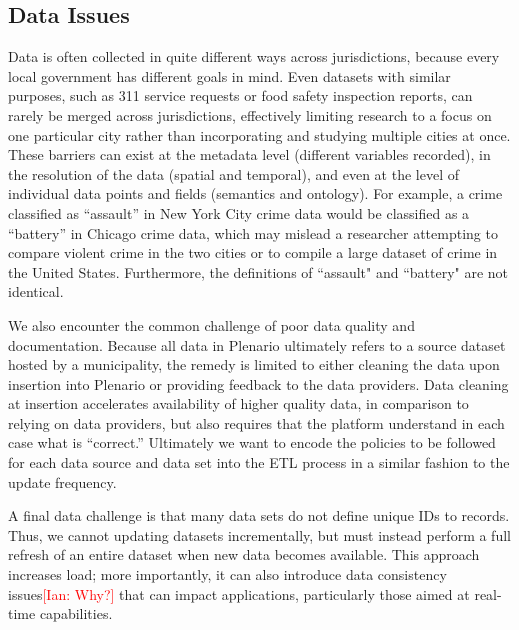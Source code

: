\documentclass[11pt]{article}
\newcommand{\ian}[1]{\textcolor{Red}{[Ian: #1]}}
\newcommand{\ian}[1]{}
\begin{document}
\subsection{\textbf{Data Issues}}
Data is often collected in quite different ways across jurisdictions, because every local government has different goals in mind. Even datasets with similar purposes, such as 311 service requests or food safety inspection reports, can rarely be merged across jurisdictions, effectively limiting research to a focus on one particular city rather than incorporating and studying multiple cities at once. These barriers can exist at the metadata level (different variables recorded), in the resolution of the data (spatial and temporal), and even at the level of individual data points and fields (semantics and ontology). For example, a crime classified as ``assault'' in New York City crime data would be classified as a ``battery'' in Chicago crime data, which may mislead a researcher attempting to compare violent crime in the two cities or to compile a large dataset of crime in the United States. Furthermore, the definitions of ``assault" and ``battery" are not identical. 

We also encounter the common challenge of poor data quality and documentation. Because all data in Plenario ultimately refers to a source dataset hosted by a municipality, the remedy is limited to either cleaning the data upon insertion into Plenario or providing feedback to the data providers. Data cleaning at insertion accelerates availability of higher quality data, in comparison to relying on data providers, but also requires that the platform understand in each case what is ``correct.'' Ultimately we want to encode the policies to be followed for each data source and data set into the ETL process in a similar fashion to the update frequency.

A final data challenge is that many data sets do not define unique IDs to records. Thus, we cannot updating datasets incrementally, but must instead perform a full refresh of an entire dataset when new data becomes available. This approach increases load; more importantly, it can also introduce data consistency issues\ian{Why?} that can impact applications, particularly those aimed at real-time capabilities. 
\end{document}

